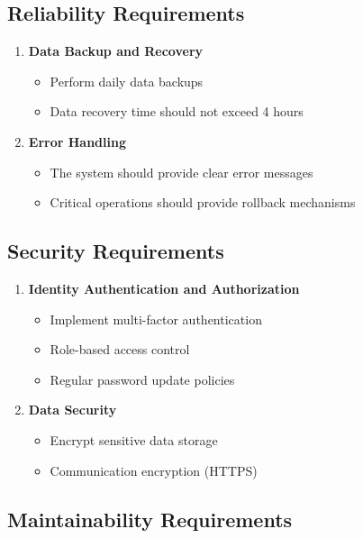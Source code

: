 \documentclass[a4paper,12pt]{article}
\begin{document}
\subsection{Reliability Requirements}

\begin{enumerate}
  
  \item \textbf{Data Backup and Recovery}
  \begin{itemize}
    \item Perform daily data backups
    \item Data recovery time should not exceed 4 hours
  \end{itemize}
  
  \item \textbf{Error Handling}
  \begin{itemize}
    \item The system should provide clear error messages
    \item Critical operations should provide rollback mechanisms
  \end{itemize}
\end{enumerate}

\subsection{Security Requirements}

\begin{enumerate}
  \item \textbf{Identity Authentication and Authorization}
  \begin{itemize}
    \item Implement multi-factor authentication
    \item Role-based access control
    \item Regular password update policies
  \end{itemize}
  
  \item \textbf{Data Security}
  \begin{itemize}
    \item Encrypt sensitive data storage
    \item Communication encryption (HTTPS)
  \end{itemize}
  
\end{enumerate}

\subsection{Maintainability Requirements}
\end{document}
